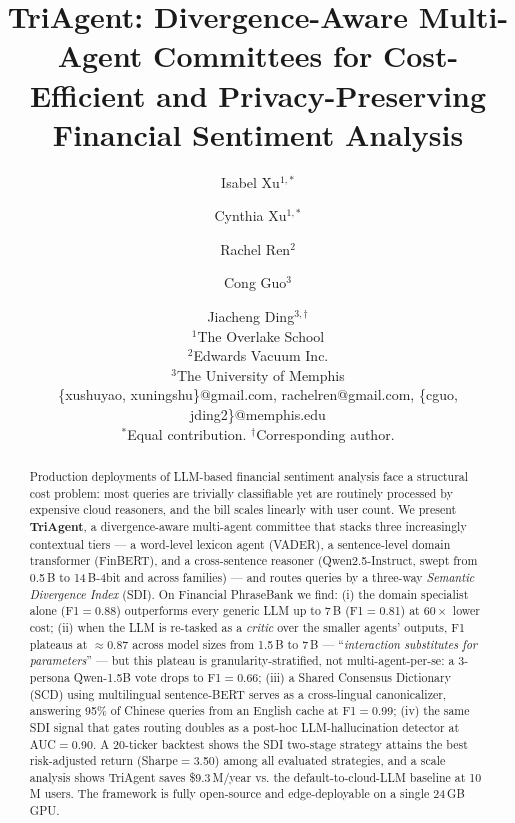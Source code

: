 \documentclass{article}
\title{TriAgent: Divergence-Aware Multi-Agent Committees for
       Cost-Efficient and Privacy-Preserving Financial Sentiment Analysis}
\author{
Isabel Xu$^{1,*}$
\and
Cynthia Xu$^{1,*}$\and
Rachel Ren$^2$\and
Cong Guo$^3$\and
Jiacheng Ding$^{3,\dagger}$\\
\affiliations
$^1$The Overlake School\\
$^2$Edwards Vacuum Inc.\\
$^3$The University of Memphis\\
\emails
\{xushuyao, xuningshu\}@gmail.com,
rachelren@gmail.com,
\{cguo, jding2\}@memphis.edu\\
$^*$Equal contribution. \quad $^\dagger$Corresponding author.
}
\begin{document}
\maketitle

\begin{abstract}
Production deployments of LLM-based financial sentiment analysis face
a structural cost problem: most queries are trivially classifiable yet
are routinely processed by expensive cloud reasoners, and the bill
scales linearly with user count.
We present \textbf{TriAgent}, a divergence-aware multi-agent committee
that stacks three increasingly contextual tiers --- a word-level
lexicon agent (VADER), a sentence-level domain transformer (FinBERT),
and a cross-sentence reasoner (Qwen2.5-Instruct, swept from 0.5\,B to
14\,B-4bit and across families) --- and routes queries by a three-way
\emph{Semantic Divergence Index} (SDI). On Financial PhraseBank we
find: (i) the domain specialist alone (F1$=$0.88) outperforms every
generic LLM up to 7\,B (F1$=$0.81) at $60\times$ lower cost; (ii) when
the LLM is re-tasked as a \emph{critic} over the smaller agents'
outputs, F1 plateaus at $\approx$0.87 across model sizes from 1.5\,B
to 7\,B --- ``\emph{interaction substitutes for parameters}'' --- but
this plateau is granularity-stratified, not multi-agent-per-se: a
3-persona Qwen-1.5B vote drops to F1$=$0.66; (iii) a Shared Consensus
Dictionary (SCD) using multilingual sentence-BERT serves as a
cross-lingual canonicalizer, answering 95\% of Chinese queries from an
English cache at F1$=$0.99; (iv) the same SDI signal that gates
routing doubles as a post-hoc LLM-hallucination detector at AUC$=$0.90.
A 20-ticker backtest shows the SDI two-stage strategy attains the best
risk-adjusted return (Sharpe$=$3.50) among all evaluated strategies,
and a scale analysis shows TriAgent saves \$9.3\,M/year vs. the
default-to-cloud-LLM baseline at 10\,M users. The framework is
fully open-source and edge-deployable on a single 24\,GB GPU.
\end{abstract}












\end{document}
